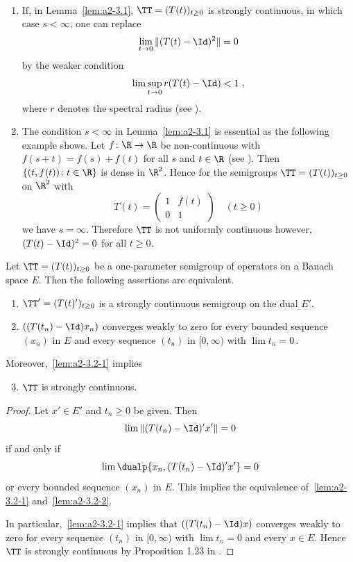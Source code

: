 \begin{remarks*}\label{rem:a2-3.1-kgk} ~ 
\begin{enumerate}[\upshape (i), wide, labelindent=0.5em]
\item \label{rem:a2-3.1-kgk-1}
If, in Lemma~\ref{lem:a2-3.1}, $\TT = (T(t))_{t \geq 0}$ is strongly continuous, in which case 
$s < \infty$, one can replace 
%
\[
	\lim_{t \to 0} \|(T(t) - \Id)^2\| = 0
\]
%
by the weaker condition 
\[
\lim \sup_{t \to 0} r(T(t) - \Id) < 1\ ,
\]
where $r$ denotes the spectral radius (see \textcite[Lemma 2]{lotz:1985}).
\item \label{rem:a2-3.1-kgk-2}
The condition $s < \infty$ in Lemma~\ref{lem:a2-3.1}   
is essential as the following example shows.
Let $f \colon \R \to \R$ be non-continuous with $f(s+t) = f(s) + f(t)$ for all $s$ and $t \in \R$ (see \textcite{hamel:1905}).
Then $\{(t,f(t)) \colon t \in \R\}$ is dense in $\R^2$.
Hence for the semigroups $\TT = (T(t))_{t \geq 0}$ on $\R^2$ with
\[
T(t) = \left( \begin{array}{cc}
    1 & f(t) \\
    0 & 1
\end{array} \right) \quad  (t \geq 0)
\]
we have $s = \infty$.
Therefore $\TT$ is not uniformly continuous however, $(T(t) - \Id)^{2} = 0$ for all $t \geq 0$.
\end{enumerate}
\end{remarks*}
\begin{lemma}\label{lem:a2-3.2}
Let $\TT = (T(t))_{t \geq 0}$ be a one-parameter semigroup of operators on a Banach space $E$.
Then the following assertions are equivalent.
\begin{enumerate}[\upshape (a)]
\item \label{lem:a2-3.2-1}
$\TT' = (T(t)')_{t \geq 0}$ is a strongly continuous semigroup on the dual $E'$.
\item \label{lem:a2-3.2-2}
$((T(t_{n}) - \Id)x_n)$ converges weakly to zero for every bounded sequence $(x_n)$ in $E$ and every sequence $(t_n)$ in $[0,\infty)$ with $\lim t_n = 0$\,.
\end{enumerate}
Moreover,~\ref{lem:a2-3.2-1}   
implies
\begin{enumerate}[\upshape (a)]
\setcounter{enumi}{2}
\item \label{lem:a2-3.2-3}
$\TT$ is strongly continuous. 
\end{enumerate}
\end{lemma}
\begin{proof}
Let $x' \in E'$ and $t_n \geq 0$ be given.
Then 
%
\[
	\lim \|(T(t_n) - \Id)'x'\| = 0 
\]
%
if and only if\/ 
%
\[
	\lim \dualp{x_n, (T(t_n) - \Id)'x'} = 0
\]
%
or every bounded sequence $(x_n)$ in $E$.
This implies the equivalence of~\ref{lem:a2-3.2-1}   and~\ref{lem:a2-3.2-2}. 

In particular,~\ref{lem:a2-3.2-1}   implies that $((T(t_n) - \Id)x)$ converges weakly to zero for every sequence $(t_n)$ in $[0,\infty)$ with $\lim t_n = 0$ and every $x \in E$.
Hence $\TT$ is strongly continuous by Proposition 1.23 in \textcite{davies:1980}.
\end{proof}

